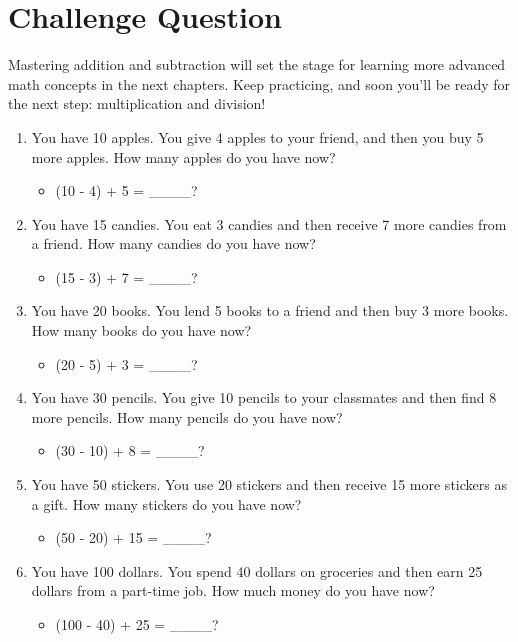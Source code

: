 \section{Challenge Question}
Mastering addition and subtraction will set the stage for learning more advanced math concepts in the next chapters. Keep practicing, and soon you’ll be ready for the next step: multiplication and division!
\begin{enumerate}   
    \item You have 10 apples. You give 4 apples to your friend, and then you buy 5 more apples. How many apples do you have now?
    \begin{itemize}
        \item (10 - 4) + 5 = \_\_\_\_?
    \end{itemize}
    \item You have 15 candies. You eat 3 candies and then receive 7 more candies from a friend. How many candies do you have now?
    \begin{itemize}
        \item (15 - 3) + 7 = \_\_\_\_?
    \end{itemize}    
    \item You have 20 books. You lend 5 books to a friend and then buy 3 more books. How many books do you have now?
    \begin{itemize}
        \item (20 - 5) + 3 = \_\_\_\_?
    \end{itemize}
    \item You have 30 pencils. You give 10 pencils to your classmates and then find 8 more pencils. How many pencils do you have now?
    \begin{itemize}
        \item (30 - 10) + 8 = \_\_\_\_?
    \end{itemize}
    \item You have 50 stickers. You use 20 stickers and then receive 15 more stickers as a gift. How many stickers do you have now?
    \begin{itemize}
        \item (50 - 20) + 15 = \_\_\_\_?
    \end{itemize}
    \item You have 100 dollars. You spend 40 dollars on groceries and then earn 25 dollars from a part-time job. How much money do you have now?
    \begin{itemize}
        \item (100 - 40) + 25 = \_\_\_\_?

\end{itemize}
\end{enumerate}
